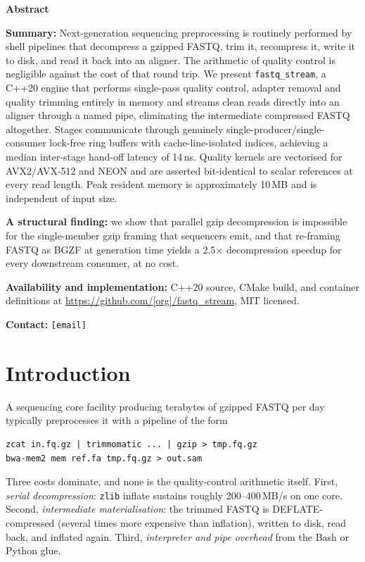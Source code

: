\noindent\textbf{Abstract}

\noindent\textbf{Summary:} Next-generation sequencing preprocessing is
routinely performed by shell pipelines that decompress a gzipped FASTQ, trim it,
recompress it, write it to disk, and read it back into an aligner. The
arithmetic of quality control is negligible against the cost of that round trip.
We present \texttt{fastq\_stream}, a C++20 engine that performs single-pass
quality control, adapter removal and quality trimming entirely in memory and
streams clean reads directly into an aligner through a named pipe, eliminating
the intermediate compressed FASTQ altogether. Stages communicate through
genuinely single-producer/single-consumer lock-free ring buffers with
cache-line-isolated indices, achieving a median inter-stage hand-off latency of
14\,ns. Quality kernels are vectorised for AVX2/AVX-512 and NEON and are
asserted bit-identical to scalar references at every read length. Peak resident
memory is approximately 10\,MB and is independent of input size.

\noindent\textbf{A structural finding:} we show that parallel gzip
decompression is impossible for the single-member gzip framing that sequencers
emit, and that re-framing FASTQ as BGZF at generation time yields a
2.5$\times$ decompression speedup for every downstream consumer, at no cost.

\noindent\textbf{Availability and implementation:} C++20 source, CMake build,
and container definitions at \url{https://github.com/[org]/fastq_stream}, MIT
licensed.

\noindent\textbf{Contact:} \texttt{[email]}

\section{Introduction}

A sequencing core facility producing terabytes of gzipped FASTQ per day
typically preprocesses it with a pipeline of the form

\begin{lstlisting}
zcat in.fq.gz | trimmomatic ... | gzip > tmp.fq.gz
bwa-mem2 mem ref.fa tmp.fq.gz > out.sam
\end{lstlisting}

Three costs dominate, and none is the quality-control arithmetic itself.
First, \emph{serial decompression}: \texttt{zlib} inflate sustains roughly
200--400\,MB/s on one core. Second, \emph{intermediate materialisation}: the
trimmed FASTQ is DEFLATE-compressed (several times more expensive than
inflation), written to disk, read back, and inflated again. Third,
\emph{interpreter and pipe overhead} from the Bash or Python glue.

